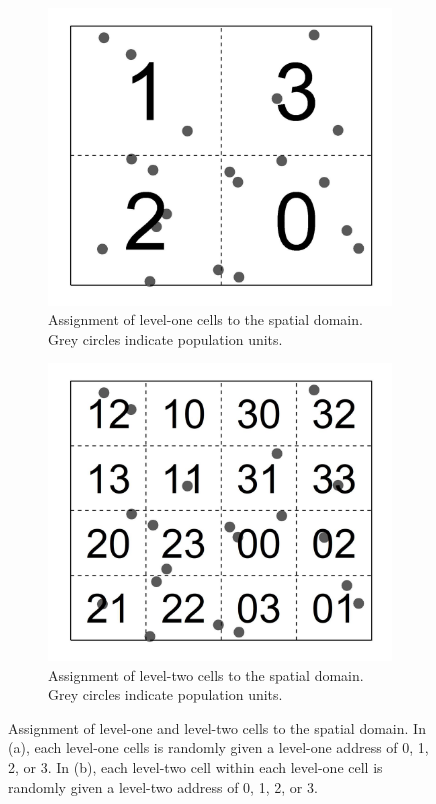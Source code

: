 \documentclass[]{elsarticle} %
\begin{document}
\begin{figure}
\centering
\begin{subfigure}{0.49\textwidth}
  \centering
  \includegraphics[width = 1\linewidth]{figures/grts_level1.jpeg}
  \caption{Assignment of level-one cells to the spatial domain. Grey circles indicate population units.}
  \label{fig:grts_level1}
\end{subfigure}
\begin{subfigure}{0.49\textwidth}
  \centering
  \includegraphics[width = 1\linewidth]{figures/grts_level2.jpeg}
  \caption{Assignment of level-two cells to the spatial domain. Grey circles indicate population units.}
  \label{fig:grts_level2}
\end{subfigure}
\caption{Assignment of level-one and level-two cells to the spatial domain. In (a), each level-one cells is randomly given a level-one address of 0, 1, 2, or 3. In (b), each level-two cell within each level-one cell is randomly given a level-two address of 0, 1, 2, or 3.}
\label{fig:grts}
\end{figure}
\end{document}

